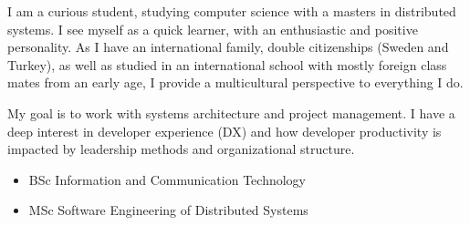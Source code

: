 I am a curious student, studying computer science with a masters in distributed systems. I see myself as a quick learner, with an enthusiastic and positive personality. As I have an international family, double citizenships (Sweden and Turkey), as well as studied in an international school with mostly foreign class mates from an early age, I provide a multicultural perspective to everything I do.

My goal is to work with systems architecture and project management. I have a deep interest in developer experience (DX) and how developer productivity is impacted by leadership methods and organizational structure.



\divider


\divider



\begin{itemize}
    \item BSc Information and Communication Technology
    \item MSc Software Engineering of Distributed Systems
\end{itemize}

\divider

